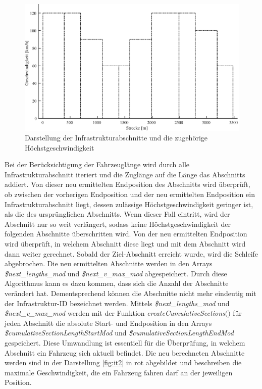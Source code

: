 \begin{figure}
  \includegraphics[width=\linewidth]{../images/matlab/it1.pdf}
  \caption{Darstellung der Infrastrukturabschnitte und die zugehörige Höchstgeschwindigkeit}
  \label{fig:it1}
\end{figure}
Bei der Berücksichtigung der Fahrzeuglänge wird durch alle Infrastrukturabschnitt iteriert und die Zuglänge auf die Länge das Abschnitts addiert. Von dieser neu ermittelten Endposition des Abschnitts wird überprüft, ob zwischen der vorherigen Endposition und der neu ermittelten Endposition ein Infrastrukturabschnitt liegt, dessen zulässige Höchstgeschwindigkeit geringer ist, als die des ursprünglichen Abschnitts. Wenn dieser Fall eintritt, wird der Abschnitt nur so weit verlängert, sodass keine Höchstgeschwindigkeit der folgenden Abschnitte überschritten wird. Von der neu ermittelten Endposition wird überprüft, in welchem Abschnitt diese liegt und mit dem Abschnitt wird dann weiter gerechnet. Sobald der Ziel-Abschnitt erreicht wurde, wird die Schleife abgebrochen. Die neu ermittelten Abschnitte werden in den Arrays \textit{\$next\_lengths\_mod} und \textit{\$next\_v\_max\_mod} abgespeichert. Durch diese Algorithmus kann es dazu kommen, dass sich die Anzahl der Abschnitte verändert hat. Dementsprechend können die Abschnitte nicht mehr eindeutig mit der Infrastruktur-ID bezeichnet werden. Mittels \textit{\$next\_lengths\_mod} und \textit{\$next\_v\_max\_mod} werden mit der Funktion \textit{createCumulativeSections$($$)$} für jeden Abschnitt die absolute Start- und Endposition in den Arrays \textit{\$cumulativeSectionLengthStartMod} und \textit{\$cumulativeSectionLengthEndMod} gespeichert. Diese Umwandlung ist essentiell für die Überprüfung, in welchem Abschnitt ein Fahrzeug sich aktuell befindet. Die neu berechneten Abschnitte werden sind in der Darstellung \ref{fig:it2} in rot abgebildet und beschreiben die maximale Geschwindigkeit, die ein Fahrzeug fahren darf an der jeweiligen Position.
